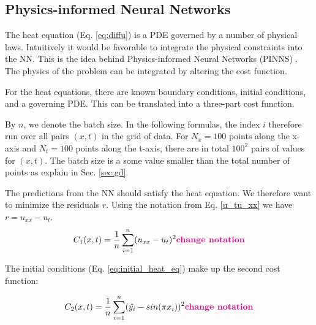 
\subsection{Physics-informed Neural Networks}

The heat equation (Eq. \ref{eq:diffu}) is a PDE governed by a number of physical laws. 
Intuitively it would be favorable to integrate the physical constraints into the NN. 
This is the idea behind Physics-informed Neural Networks (PINNS) \cite{PINNs}.
The physics of the problem can be integrated by altering the cost function. 

For the heat equations, there are known boundary conditions, initial conditions, and a governing PDE. 
This can be translated into a three-part cost function. 

By $n$, we denote the batch size. 
In the following formulas, the index $i$ therefore run over all pairs $(x,t)$ in the grid of data. 
For $N_x = 100$ points along the x-axis and $N_t = 100$ points along the t-axis, there are in total $100^2$ pairs of values for $(x,t)$. 
The batch size is a some value smaller than the total number of points as explain in Sec. \ref{sec:gd}.

The predictions from the NN should satisfy the heat equation. 
We therefore want to minimize the residuals $r$. 
Using the notation from Eq. \ref{u_tu_xx} we have $r = u_{xx} - u_t$. 
\begin{equation}
    C_1(x,t) = \frac{1}{n}\sum_{i=1}^{n}(u_{xx} - u_t)^2\textbf{\color{magenta}{change notation}}
\end{equation}

The initial conditions (Eq. \ref{eq:initial_heat_eq}) make up the second cost function: 

\begin{equation}
    C_2(x,t) = \frac{1}{n}\sum_{i=1}^{n}(\hat{y_i}-sin(\pi x_i))^2\textbf{\color{magenta}{change notation}}
\end{equation}

